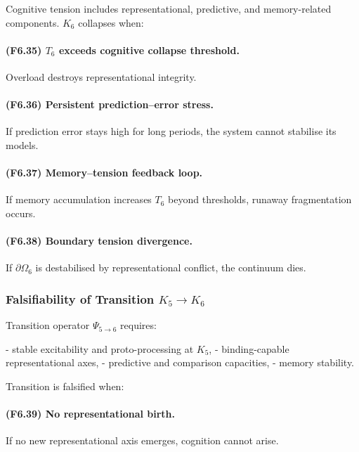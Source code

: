 Cognitive tension includes representational, predictive, and memory-related
components. $K_6$ collapses when:

\paragraph{(F6.35) \texorpdfstring{$T_6$}{T_6} exceeds cognitive collapse threshold.}
Overload destroys representational integrity.

\paragraph{(F6.36) Persistent prediction–error stress.}
If prediction error stays high for long periods,
the system cannot stabilise its models.

\paragraph{(F6.37) Memory–tension feedback loop.}
If memory accumulation increases $T_6$ beyond thresholds,
runaway fragmentation occurs.

\paragraph{(F6.38) Boundary tension divergence.}
If $\partial\Omega_6$ is destabilised by representational conflict,
the continuum dies.



\subsubsection{Falsifiability of Transition \texorpdfstring{$K_5 \to K_6$}{K_5 \to K_6}}

Transition operator $\Psi_{5\to 6}$ requires:

- stable excitability and proto-processing at $K_5$,
- binding-capable representational axes,
- predictive and comparison capacities,
- memory stability.

Transition is falsified when:

\paragraph{(F6.39) No representational birth.}
If no new representational axis emerges,
cognition cannot arise.

